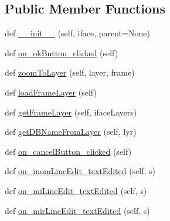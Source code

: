 \subsection*{Public Member Functions}
\begin{DoxyCompactItemize}
\item 
def \mbox{\hyperlink{class_dsg_tools_1_1_layer_tools_1_1_create_frame_tool_1_1ui__create__inom__dialog_1_1_create_inom_dialog_a602cc80404698c761f822e3eca7e36ca}{\+\_\+\+\_\+init\+\_\+\+\_\+}} (self, iface, parent=None)
\item 
def \mbox{\hyperlink{class_dsg_tools_1_1_layer_tools_1_1_create_frame_tool_1_1ui__create__inom__dialog_1_1_create_inom_dialog_aec6cf4645e2d7c2c5bd8a0c0633d1672}{on\+\_\+ok\+Button\+\_\+clicked}} (self)
\item 
def \mbox{\hyperlink{class_dsg_tools_1_1_layer_tools_1_1_create_frame_tool_1_1ui__create__inom__dialog_1_1_create_inom_dialog_af10b5ebe354f1a4c9c5d3b0e59bcaa27}{zoom\+To\+Layer}} (self, layer, frame)
\item 
def \mbox{\hyperlink{class_dsg_tools_1_1_layer_tools_1_1_create_frame_tool_1_1ui__create__inom__dialog_1_1_create_inom_dialog_a3033e4492862b5fa1c092b27fda4cbcf}{load\+Frame\+Layer}} (self)
\item 
def \mbox{\hyperlink{class_dsg_tools_1_1_layer_tools_1_1_create_frame_tool_1_1ui__create__inom__dialog_1_1_create_inom_dialog_a1273b851f15b0baa00d046262613cffe}{get\+Frame\+Layer}} (self, iface\+Layers)
\item 
def \mbox{\hyperlink{class_dsg_tools_1_1_layer_tools_1_1_create_frame_tool_1_1ui__create__inom__dialog_1_1_create_inom_dialog_a6d64367cb126c7e4db21eb563ab9e723}{get\+D\+B\+Name\+From\+Layer}} (self, lyr)
\item 
def \mbox{\hyperlink{class_dsg_tools_1_1_layer_tools_1_1_create_frame_tool_1_1ui__create__inom__dialog_1_1_create_inom_dialog_a233779aeb260ee0005cfb27afd155ce3}{on\+\_\+cancel\+Button\+\_\+clicked}} (self)
\item 
def \mbox{\hyperlink{class_dsg_tools_1_1_layer_tools_1_1_create_frame_tool_1_1ui__create__inom__dialog_1_1_create_inom_dialog_a87b2255adee517d81f93b6e311fdf256}{on\+\_\+inom\+Line\+Edit\+\_\+text\+Edited}} (self, s)
\item 
def \mbox{\hyperlink{class_dsg_tools_1_1_layer_tools_1_1_create_frame_tool_1_1ui__create__inom__dialog_1_1_create_inom_dialog_a659e71072cbac125231da4f67644c93d}{on\+\_\+mi\+Line\+Edit\+\_\+text\+Edited}} (self, s)
\item 
def \mbox{\hyperlink{class_dsg_tools_1_1_layer_tools_1_1_create_frame_tool_1_1ui__create__inom__dialog_1_1_create_inom_dialog_aee3efd597da6ed6ccd7a5ff5a2a6dc10}{on\+\_\+mir\+Line\+Edit\+\_\+text\+Edited}} (self, s)

\end{DoxyCompactItemize}
